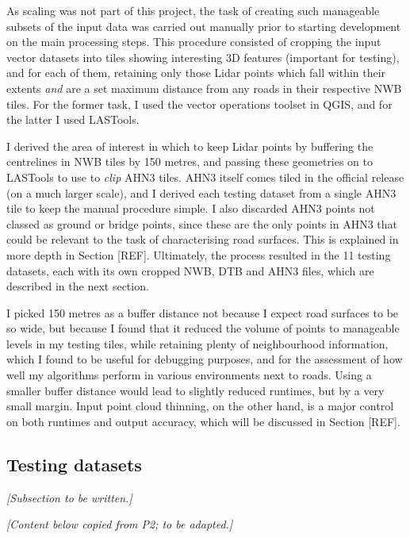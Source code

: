 As scaling was not part of this project, the task of creating such manageable subsets of the input data was carried out manually prior to starting development on the main processing steps. This procedure consisted of cropping the input vector datasets into tiles showing interesting 3D features (important for testing), and for each of them, retaining only those Lidar points which fall within their extents \textit{and} are a set maximum distance from any roads in their respective NWB tiles. For the former task, I used the vector operations toolset in QGIS, and for the latter I used LASTools.

I derived the area of interest in which to keep Lidar points by buffering the centrelines in NWB tiles by 150 metres, and passing these geometries on to LASTools to use to \textit{clip} AHN3 tiles. AHN3 itself comes tiled in the official release (on a much larger scale), and I derived each testing dataset from a single AHN3 tile to keep the manual procedure simple. I also discarded AHN3 points not classed as ground or bridge points, since these are the only points in AHN3 that could be relevant to the task of characterising road surfaces. This is explained in more depth in Section [REF]. Ultimately, the process resulted in the 11 testing datasets, each with its own cropped NWB, DTB and AHN3 files, which are described in the next section.

I picked 150 metres as a buffer distance not because I expect road surfaces to be so wide, but because I found that it reduced the volume of points to manageable levels in my testing tiles, while retaining plenty of neighbourhood information, which I found to be useful for debugging purposes, and for the assessment of how well my algorithms perform in various environments next to roads. Using a smaller buffer distance would lead to slightly reduced runtimes, but by a very small margin. Input point cloud thinning, on the other hand, is a major control on both runtimes and output accuracy, which will be discussed in Section [REF].

\subsection{Testing datasets}
\label{sub:testingdata}

\textit{[Subsection to be written.]}

\textit{[Content below copied from P2; to be adapted.]}

